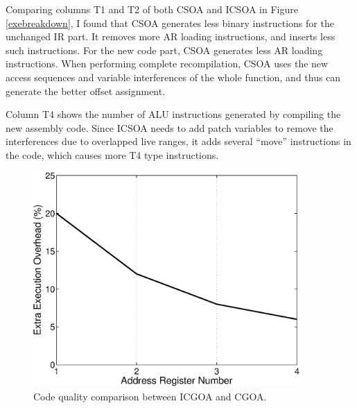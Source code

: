 Comparing columns T1 and T2 of both CSOA and ICSOA in Figure \ref{exebreakdown}, I found that CSOA generates less 
binary instructions for the unchanged IR part. It removes more AR loading instructions, and inserts less such 
instructions. For the new code part, CSOA generates less AR loading instructions. When performing complete 
recompilation, CSOA uses the new access sequences and variable interferences of the whole function, and thus can 
generate the better offset assignment.

Column T4 shows the number of ALU instructions generated by compiling the new assembly code.  Since ICSOA needs to add 
patch variables to remove the interferences due to overlapped live ranges, it adds several ``move'' instructions in the 
code, which causes more T4 type instructions.

\begin{figure}[htbp]
\begin{center}
\includegraphics[width=4in]{./figures/exe_ar.eps}
\caption{Code quality comparison between ICGOA and CGOA.}
\label{exe_ar}
\end{center}
\end{figure}

